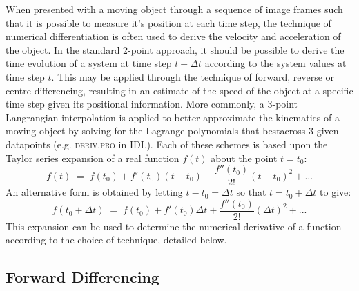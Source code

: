 \documentclass[namedreferences]{SolarPhysics}
\begin{document}
\begin{article}
When presented with a moving object through a sequence of image frames such that it is possible to measure it's position at each time step, the technique of numerical differentiation is often used to derive the velocity and acceleration of the object. In the standard 2-point approach, it should be possible to derive the time evolution of a system at time step $t+\Delta t$ according to the system values at time step $t$. This may be applied through the technique of forward, reverse or centre differencing, resulting in an estimate of the speed of the object at a specific time step given its positional information. More commonly, a 3-point Langrangian interpolation is applied to better approximate the kinematics of a moving object by solving for the Lagrange polynomials that bestacross 3 given datapoints (e.g. \textsc{deriv.pro} in IDL). Each of these schemes is based upon the Taylor series expansion of a real function $f(t)$ about the point $t=t_0$:
\begin{equation}
\label{taylor1}
f(t) \; = \; f(t_0) + f'(t_0)(t-t_0) +  \frac{f''(t_0)}{2!}(t-t_0)^{2}   + ...
\end{equation}
An alternative form is obtained by letting $t-t_0=\Delta t$ so that $t=t_0+\Delta t$ to give:
\begin{equation}
\label{taylor2}
f(t_0+\Delta t) \; = \; f(t_0)+f'(t_0)\Delta t +  \frac{f''(t_0)}{2!}(\Delta t)^{2}  + ...
\end{equation}
This expansion can be used to determine the numerical derivative of a function according to the choice of technique, detailed below.

\subsection{Forward Differencing} %


\end{article}
\end{document}
